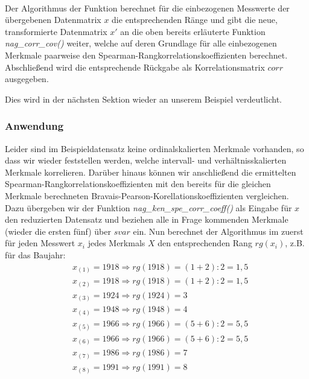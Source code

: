\\

\noindent Der Algorithmus der Funktion berechnet für die einbezogenen Messwerte der übergebenen Datenmatrix $x$ die entsprechenden Ränge und gibt die neue, transformierte Datenmatrix $x'$ an die oben bereits erläuterte Funktion {\it nag\_corr\_cov()} weiter, welche auf deren Grundlage für alle einbezogenen Merkmale paarweise den Spearman-Rangkorrelationskoeffizienten berechnet. Abschließend wird die entsprechende Rückgabe als Korrelationsmatrix $corr$ ausgegeben.

Dies wird in der nächsten Sektion wieder an unserem Beispiel verdeutlicht.

\subsubsection{Anwendung}

Leider sind im Beispieldatensatz keine ordinalskalierten Merkmale vorhanden, so dass wir wieder feststellen werden, welche intervall- und verhältnisskalierten Merkmale korrelieren. Darüber hinaus können wir anschließend die ermittelten Spearman-Rangkorrelationskoeffizienten mit den bereits für die gleichen Merkmale berechneten Bravais-Pearson-Korellationskoeffizienten vergleichen. Dazu übergeben wir der Funktion {\it nag\_ken\_spe\_corr\_coeff()} als Eingabe für $x$ den reduzierten Datensatz und beziehen alle in Frage kommenden Merkmale (wieder die ersten fünf) über $svar$ ein. Nun berechnet der Algorithmus im zuerst für jeden Messwert $x_i$ jedes Merkmals $X$ den entsprechenden Rang $rg(x_i)$, z.B. für das Baujahr:
\begin{equation*}
	\begin{split}
		& x_{(1)}=1918 \Rightarrow rg(1918)=(1+2):2=1,5\\
		& x_{(2)}=1918 \Rightarrow rg(1918)=(1+2):2=1,5\\
		& x_{(3)}=1924 \Rightarrow rg(1924)=3\\
		& x_{(4)}=1948 \Rightarrow rg(1948)=4\\
		& x_{(5)}=1966 \Rightarrow rg(1966)=(5+6):2=5,5\\
		& x_{(6)}=1966 \Rightarrow rg(1966)=(5+6):2=5,5\\
		& x_{(7)}=1986 \Rightarrow rg(1986)=7\\
		& x_{(8)}=1991 \Rightarrow rg(1991)=8
	\end{split}
\end{equation*}

